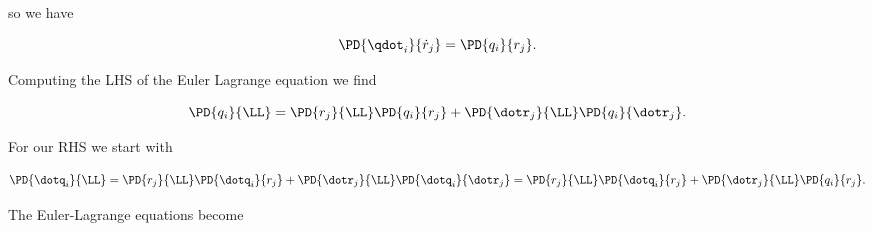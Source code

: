 so we have

\begin{equation}\label{eqn:classicalMechanicsPs1:n}
\PD{\qdot_i}{\dot{r}_j} = \PD{q_i}{r_j}.
\end{equation}

Computing the LHS of the Euler Lagrange equation we find

\begin{equation}\label{eqn:classicalMechanicsPs1:n}
\PD{q_i}{\LL} = 
\PD{r_j}{\LL} \PD{q_i}{r_j}
+\PD{\dotr_j}{\LL} \PD{q_i}{\dotr_j}.
\end{equation}

For our RHS we start with

\begin{equation}\label{eqn:classicalMechanicsPs1:n}
\PD{\dotq_i}{\LL} 
= 
\PD{r_j}{\LL} \PD{\dotq_i}{r_j}
+\PD{\dotr_j}{\LL} \PD{\dotq_i}{\dotr_j}
= 
\PD{r_j}{\LL} \PD{\dotq_i}{r_j}
+\PD{\dotr_j}{\LL} \PD{q_i}{r_j}.
\end{equation}

The Euler-Lagrange equations become

\EndArticle
